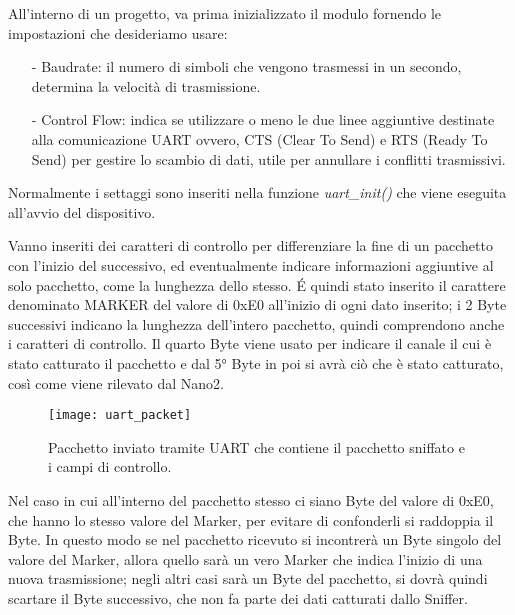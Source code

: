 \begin{samepage}
All'interno di un progetto, va prima inizializzato il modulo fornendo le impostazioni che desideriamo usare:
\begin{itemize}
\item[-] Baudrate: il numero di simboli che vengono trasmessi in un secondo, determina la velocità di trasmissione.
\item[-] Control Flow: indica se utilizzare o meno le due linee aggiuntive destinate alla comunicazione UART ovvero, CTS (Clear To Send) e RTS (Ready To Send) per gestire lo scambio di dati, utile per annullare i conflitti trasmissivi.
\end{itemize}
Normalmente i settaggi sono inseriti nella funzione \emph{uart\_init()} che viene eseguita all'avvio del dispositivo.
\end{samepage}

Vanno inseriti dei caratteri di controllo per differenziare la fine di un pacchetto con l'inizio del successivo, ed eventualmente indicare informazioni aggiuntive al solo pacchetto, come la lunghezza dello stesso. \'E quindi stato inserito il carattere denominato MARKER del valore di 0xE0 all'inizio di ogni dato inserito; i 2 Byte successivi indicano la lunghezza dell'intero pacchetto, quindi comprendono anche i caratteri di controllo. Il quarto Byte viene usato per indicare il canale il cui è stato catturato il pacchetto e dal 5° Byte in poi si avrà ciò che è stato catturato, così come viene rilevato dal Nano2.
\begin{figure}[H]
\texttt{[image: uart\_packet]}
\centering
\caption{Pacchetto inviato tramite UART che contiene il pacchetto sniffato e i campi di controllo.}
\end{figure}
Nel caso in cui all'interno del pacchetto stesso ci siano Byte del valore di 0xE0, che hanno lo stesso valore del Marker, per evitare di confonderli si raddoppia il Byte. In questo modo se nel pacchetto ricevuto si incontrerà un Byte singolo del valore del Marker, allora quello sarà un vero Marker che indica l'inizio di una nuova trasmissione; negli altri casi sarà un Byte del pacchetto, si dovrà quindi scartare il Byte successivo, che non fa parte dei dati catturati dallo Sniffer.

